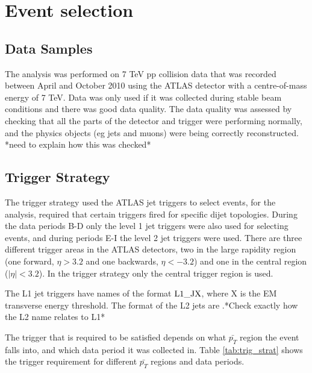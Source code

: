 \section {Event selection}
\label{sec:GBJ1:EvtSel}
\subsection{Data Samples}
The analysis was performed on 7 TeV pp collision data that was recorded between April and October 2010 using the ATLAS detector with a centre-of-mass energy of 7 TeV. 
Data was only used if it was collected during stable beam conditions and there was good data quality. 
The data quality was assessed by checking that all the parts of the detector and trigger were performing normally, and the physics objects (eg jets and muons) were being correctly reconstructed. *need to explain how this was checked*

\subsection{Trigger Strategy}
The trigger strategy used the ATLAS jet triggers to select events, for the analysis, required that certain triggers fired for specific dijet topologies. 
During the data periods B-D only the level 1 jet triggers were also used for selecting events, and during periods E-I the level 2 jet triggers were used. 
There are three different trigger areas in the ATLAS detectors, two in the large rapidity region (one forward, $\eta>3.2$ and one backwards, $\eta<-3.2$) and one in the central region ($|\eta|<3.2$). 
In the trigger strategy only the central trigger region is used. 

The L1 jet triggers have names of the format $\rm L1\_JX$, where X is the EM transverse energy threshold.
The format of the L2 jets are .*Check exactly how the L2 name relates to L1*
 
The trigger that is required to be satisfied depends on what $\bar{p_T}$ region the event falls into, and which data period it was collected in. 
Table \ref{tab:trig_strat} shows the trigger requirement for different $\bar{p_T}$ regions and data periods.

